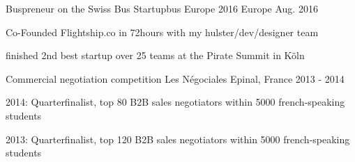 

\begin{cventries}

  \cventry
    {Buspreneur on the Swiss Bus} %
    {Startupbus Europe 2016} %
    {Europe} %
    {Aug. 2016} %
    {
      \begin{cvitems} %
        \item {Co-Founded Flightship.co in 72hours with my hulster/dev/designer team}
        \item {finished 2nd best startup over 25 teams at the Pirate Summit in Köln}
      \end{cvitems}
    }

  \cventry
    {Commercial negotiation competition} %
    {Les Négociales} %
    {Epinal, France} %
    {2013 - 2014} %
    {
    	\begin{cvitems}
    	\item{2014: Quarterfinalist, top 80 B2B sales negotiators within 5000 french-speaking students}
    	\item{2013: Quarterfinalist, top 120 B2B sales negotiators within 5000 french-speaking students}
    	\end{cvitems}
    }
\end{cventries}

